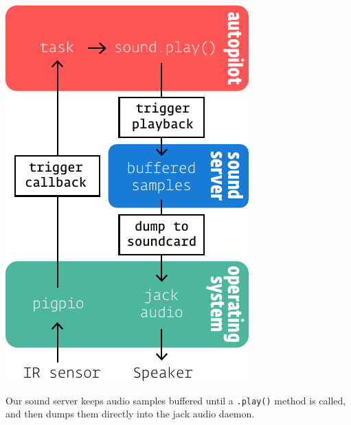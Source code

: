 \begin{marginfigure}[-3cm]
\includegraphics[]{figures/side_19_soundpath.pdf}
\caption{Our sound server keeps audio samples buffered until a \texttt{.play()} method is called, and then dumps them directly into the jack audio daemon.}
\label{fig:soundpath}
\end{marginfigure}
